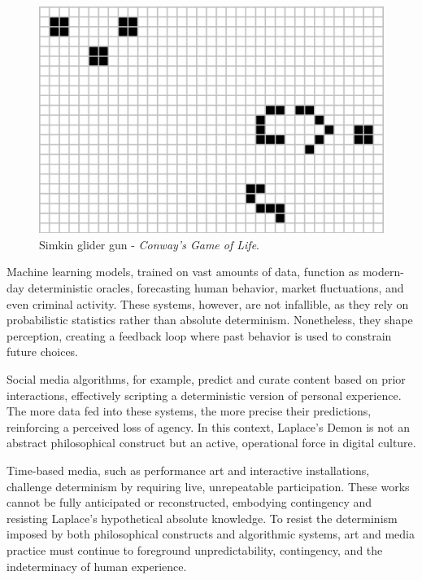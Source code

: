 \begin{figure}
    \centering
    \includegraphics[width=0.8\linewidth]{assets/gol.png} 
    \caption{\small Simkin glider gun - \textit{Conway's Game of Life}.}
    \label{fig:gol}
\end{figure}

Machine learning models, trained on vast amounts of data, function as modern-day deterministic oracles, forecasting human behavior, market fluctuations, and even criminal activity. These systems, however, are not infallible, as they rely on probabilistic statistics rather than absolute determinism. Nonetheless, they shape perception, creating a feedback loop where past behavior is used to constrain future choices.

Social media algorithms, for example, predict and curate content based on prior interactions, effectively scripting a deterministic version of personal experience. The more data fed into these systems, the more precise their predictions, reinforcing a perceived loss of agency. In this context, Laplace's Demon is not an abstract philosophical construct but an active, operational force in digital culture.

Time-based media, such as performance art and interactive installations, challenge determinism by requiring live, unrepeatable participation. These works cannot be fully anticipated or reconstructed, embodying contingency and resisting Laplace's hypothetical absolute knowledge. To resist the determinism imposed by both philosophical constructs and algorithmic systems, art and media practice must continue to foreground unpredictability, contingency, and the indeterminacy of human experience.


